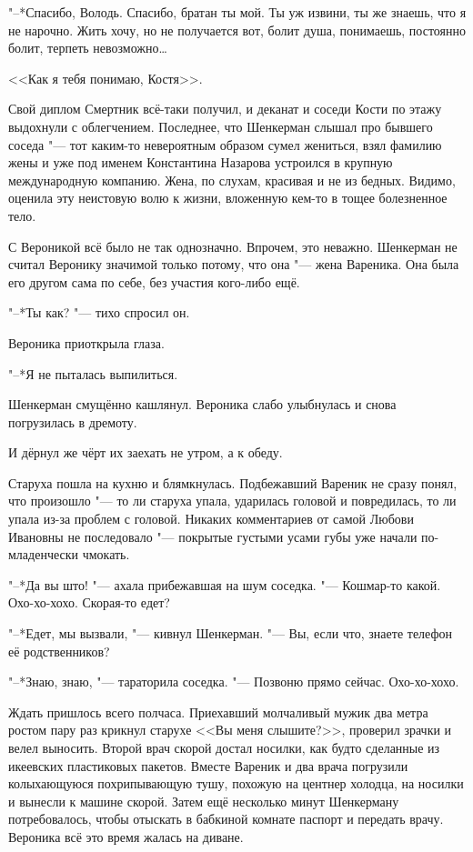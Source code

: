 "--*Спасибо, Володь.
Спасибо, братан ты мой.
Ты уж извини, ты же знаешь, что я не нарочно.
Жить хочу, но не получается вот, болит душа, понимаешь, постоянно болит, терпеть невозможно\dots{}

<<Как я тебя понимаю, Костя>>.

Свой диплом Смертник всё-таки получил, и деканат и соседи Кости по этажу выдохнули с облегчением.
Последнее, что Шенкерман слышал про бывшего соседа "--- тот каким-то невероятным образом сумел жениться, взял фамилию жены и уже под именем Константина Назарова устроился в крупную международную компанию.
Жена, по слухам, красивая и не из бедных.
Видимо, оценила эту неистовую волю к жизни, вложенную кем-то в тощее болезненное тело.

С Вероникой всё было не так однозначно.
Впрочем, это неважно.
Шенкерман не считал Веронику значимой только потому, что она "--- жена Вареника.
Она была его другом сама по себе, без участия кого-либо ещё.

"--*Ты как? "--- тихо спросил он.

Вероника приоткрыла глаза.

"--*Я не пыталась выпилиться.

Шенкерман смущённо кашлянул.
Вероника слабо улыбнулась и снова погрузилась в дремоту.

\asterism

И дёрнул же чёрт их заехать не утром, а к обеду.

Старуха пошла на кухню и блямкнулась.
Подбежавший Вареник не сразу понял, что произошло "--- то ли старуха упала, ударилась головой и повредилась, то ли упала из-за проблем с головой.
Никаких комментариев от самой Любови Ивановны не последовало "--- покрытые густыми усами губы уже начали по-младенчески чмокать.

"--*Да вы што! "--- ахала прибежавшая на шум соседка.
"--- Кошмар-то какой.
Охо-хо-хохо.
Скорая-то едет?

"--*Едет, мы вызвали, "--- кивнул Шенкерман.
"--- Вы, если что, знаете телефон её родственников?

"--*Знаю, знаю, "--- тараторила соседка.
"--- Позвоню прямо сейчас.
Охо-хо-хохо.

Ждать пришлось всего полчаса.
Приехавший молчаливый мужик два метра ростом пару раз крикнул старухе <<Вы меня слышите?>>, проверил зрачки и велел выносить.
Второй врач скорой достал носилки, как будто сделанные из икеевских пластиковых пакетов.
Вместе Вареник и два врача погрузили колыхающуюся похрипывающую тушу, похожую на центнер холодца, на носилки и вынесли к машине скорой.
Затем ещё несколько минут Шенкерману потребовалось, чтобы отыскать в бабкиной комнате паспорт и передать врачу.
Вероника всё это время жалась на диване.

